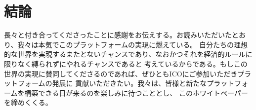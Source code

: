 \documentclass{jsarticle}
\begin{document}
\section{結論}
長々と付き合ってくださったことに感謝をお伝えする。お読みいただいたとおり、我々は本気でこのプラットフォームの実現に燃えている。
自分たちの理想的な世界を実現するまたとないチャンスであり、なおかつそれを経済的ルールに限りなく縛られずにやれるチャンスであると
考えているからである。もしこの世界の実現に賛同してくださるのであれば、ぜひともICOにご参加いただきプラットフォームの発展に
貢献いただきたい。我々は、皆様と新たなプラットフォームを構築できる日が来るのを楽しみに待つこととし、
このホワイトペーパーを締めくくる。
\end{document}
